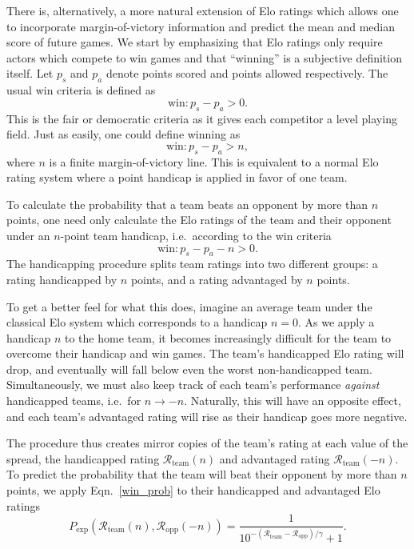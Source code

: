 \documentclass[aps,prc,reprint,amsmath,superscriptaddress]{revtex4-1}
\newcommand{\R}{\mathcal{R}}
\begin{document}
There is, alternatively, a more natural extension of Elo ratings which allows one to incorporate margin-of-victory information and predict the mean and median score of future games.
We start by emphasizing that Elo ratings only require actors which compete to win games and that ``winning'' is a subjective definition itself.
Let $p_s$ and $p_a$ denote points scored and points allowed respectively.
The usual win criteria is defined as
\begin{equation}
  \text{win}: p_s - p_a > 0.
\end{equation}
This is the fair or democratic criteria as it gives each competitor a level playing field.
Just as easily, one could define winning as
\begin{equation}
  \text{win}: p_s - p_a > n,
\end{equation}
where $n$ is a finite margin-of-victory line.
This is equivalent to a normal Elo rating system where a point handicap is applied in favor of one team.

To calculate the probability that a team beats an opponent by more than $n$ points, one need only calculate the Elo ratings of the team and their opponent under an $n$-point team handicap, i.e.\ according to the win criteria
\begin{equation}
  \text{win}: p_s - p_a - n > 0.
\end{equation}
The handicapping procedure splits team ratings into two different groups: a rating handicapped by $n$ points, and a rating advantaged by $n$ points.

To get a better feel for what this does, imagine an average team under the classical Elo system which corresponds to a handicap $n=0$. 
As we apply a handicap $n$ to the home team, it becomes increasingly difficult for the team to overcome their handicap and win games.
The team's handicapped Elo rating will drop, and eventually will fall below even the worst non-handicapped team.
Simultaneously, we must also keep track of each team's performance \emph{against} handicapped teams, i.e.\ for $n \rightarrow -n$.
Naturally, this will have an opposite effect, and each team's advantaged rating will rise as their handicap goes more negative.

The procedure thus creates mirror copies of the team's rating at each value of the spread, the handicapped rating $\R_\text{team}(n)$ and advantaged rating $\R_\text{team}(-n)$.
To predict the probability that the team will beat their opponent by more than $n$ points, we apply Eqn.~\eqref{win_prob} to their handicapped and advantaged Elo ratings
\begin{equation}
  P_\text{exp}(\R_\text{team}(n), \R_\text{opp}(-n)) = \frac{1}{10^{-(\R_\text{team} - \R_\text{opp})/\gamma} + 1}.
\end{equation}
\end{document}
